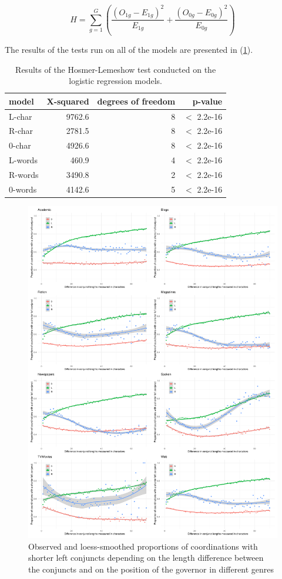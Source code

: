 \begin{equation}\label{eq:hoslem}
H = \sum_{g=1}^{G}\left(\frac{(O_{1g}-E_{1g})^2}{E_{1g}} + \frac{(O_{0g}-E_{0g})^2}{E_{0g}}\right)
\end{equation}

The results of the tests run on all of the models are presented in (\ref{tab:hoslem}).

\begin{table}[hbt!]
\begin{tabular}{l|r|r|r|}
model & X-squared & degrees of freedom & p-value\\\hline
L-char & 9762.6 & 8 & $<$ 2.2e-16\\
R-char & 2781.5 & 8 & $<$ 2.2e-16\\
0-char & 4926.6 & 8 & $<$ 2.2e-16\\
L-words & 460.9 & 4 & $<$ 2.2e-16\\
R-words & 3490.8 & 2 & $<$ 2.2e-16\\
0-words & 4142.6 & 5 & $<$ 2.2e-16
\end{tabular}
\caption{Results of the Hosmer-Lemeshow test conducted on the logistic regression models.}
\label{tab:hoslem}
\end{table}

\begin{figure}
    \hspace{-.1\textwidth}
    \includegraphics[width=1.2\textwidth]{inputs/genres.pdf}
    \caption{\centering Observed and loess-smoothed proportions of coordinations with shorter left conjuncts depending on the length difference between the conjuncts and on the position of the governor in different genres}
\end{figure}
